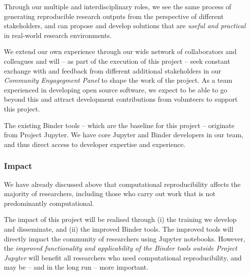 Through our multiple and interdisciplinary roles, we see the same process of
generating reproducible research outputs from the perspective of different
stakeholders, and can propose and develop solutions that are \emph{useful and
  practical} in real-world research environments.

We extend our own experience through our wide network of collaborators and
colleagues and will -- as part of the execution of this project -- seek
constant exchange with and feedback from different additional stakeholders in
our \emph{Community Engagegment Panel} to shape the work of the
\TheProject project. As a team experienced in developing open source software,
we expect to be able to go beyond this and attract development contributions
from volunteers to support this project.

The existing Binder tools -- which are the baseline for this project --
originate from Project Jupyter. We have core Jupyter and Binder developers in
our team, and thus direct access to developer expertise and experience.

\subsubsection{Impact}

We have already discussed above that computational reproducibility affects the
majority of researchers, including those who carry out work that is not
predominantly computational.

The impact of this project will be realised through (i) the training we develop
and disseminate, and (ii) the improved Binder tools. The improved tools will
directly impact the community of researchers using Jupyter notebooks. However,
the \emph{improved functionality and applicability of the Binder tools outside Project
Jupyter} will benefit all researchers who need computational reproducibility, and
may be -- and in the long run -- more important.

\medskip

